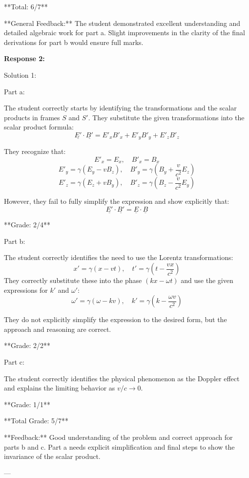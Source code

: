 \documentclass[a4paper,11pt]{article}
\begin{document}
**Total: 6/7**

**General Feedback:** The student demonstrated excellent understanding and detailed algebraic work for part a. Slight improvements in the clarity of the final derivations for part b would ensure full marks.

\bigskip
\textbf{Response 2:}

Solution 1:

Part a:

The student correctly starts by identifying the transformations and the scalar products in frames \( S \) and \( S' \). They substitute the given transformations into the scalar product formula:
\[ \underline{E'} \cdot \underline{B'} = E'_{x}B'_{x} + E'_{y}B'_{y} + E'_{z}B'_{z} \]

They recognize that:
\[ E'_{x} = E_{x}, \quad B'_{x} = B_{x} \]
\[ E'_{y} = \gamma(E_{y} - vB_{z}), \quad B'_{y} = \gamma(B_{y} + \frac{v}{c^{2}}E_{z}) \]
\[ E'_{z} = \gamma(E_{z} + vB_{y}), \quad B'_{z} = \gamma(B_{z} - \frac{v}{c^{2}}E_{y}) \]

However, they fail to fully simplify the expression and show explicitly that:
\[ \underline{E'} \cdot \underline{B'} = \underline{E} \cdot \underline{B} \]

**Grade: 2/4**

Part b:

The student correctly identifies the need to use the Lorentz transformations:
\[ x' = \gamma(x - vt), \quad t' = \gamma \left(t - \frac{vx}{c^{2}} \right) \]
They correctly substitute these into the phase \( (kx - \omega t) \) and use the given expressions for \( k' \) and \( \omega' \):
\[ \omega' = \gamma(\omega - kv), \quad k' = \gamma(k - \frac{\omega v}{c^{2}}) \]

They do not explicitly simplify the expression to the desired form, but the approach and reasoning are correct.

**Grade: 2/2**

Part c:

The student correctly identifies the physical phenomenon as the Doppler effect and explains the limiting behavior as \( v/c \rightarrow 0 \).

**Grade: 1/1**

**Total Grade: 5/7**

**Feedback:** Good understanding of the problem and correct approach for parts b and c. Part a needs explicit simplification and final steps to show the invariance of the scalar product.

---
\end{document}
